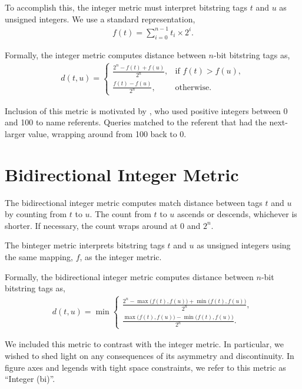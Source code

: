 To accomplish this, the integer metric must interpret bitstring tags $t$ and $u$ as unsigned integers.
We use a standard representation,
\begin{align*}
f(t)
= \sum_{i=0}^{n-1} t_i \times 2^i.
\end{align*}

Formally, the integer metric computes distance between $n$-bit bitstring tags as,
\begin{align*}
d(t, u) =
\begin{cases}
  \frac{2^n - f(t) + f(u)}{2^n}, & \text{if } f(t) > f(u), \\
  \frac{f(t) - f(u)}{2^n},         & \text{otherwise}.
\end{cases}
\end{align*}

Inclusion of this metric is motivated by \cite{spector2011tag}, who used positive integers between 0 and 100 to name referents.
Queries matched to the referent that had the next-larger value, wrapping around from 100 back to 0.

\section{Bidirectional Integer Metric} \label{sec:bidirectionalinteger}

The bidirectional integer metric computes match distance between tags $t$ and $u$ by counting from $t$ to $u$.
The count from $t$ to $u$ ascends or descends, whichever is shorter.
If necessary, the count wraps around at $0$ and $2^n$.

The binteger metric interprets bitstring tags $t$ and $u$ as unsigned integers using the same mapping, $f$, as the integer metric.

Formally, the bidirectional integer metric computes distance between $n$-bit bitstring tags as,
\begin{align*}
d(t, u) =
\min
\begin{cases}
  \frac{2^n - \max\big(f(t), f(u)\big) + \min\big(f(t), f(u)\big)}{2^n}, \\
  \frac{\max\big(f(t), f(u)\big) - \min\big(f(t), f(u)\big)}{2^n}.
\end{cases}
\end{align*}

We included this metric to contrast with the integer metric. In particular, we wished to shed light on any consequences of its asymmetry and discontinuity.
In figure axes and legends with tight space constraints, we refer to this metric as ``Integer (bi)''.

